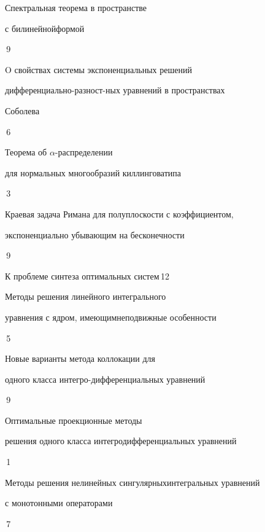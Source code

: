 

{Спектральная теорема в пространстве


с билинейной\newline формой}{\No\,9}




{O свойствах системы экспоненциальных решений 


дифференциально-разност-\newline ных уравнений в пространствах 


Соболева}{\No\,6}




{Теорема об $\alpha$-распределении


для нормальных многообразий киллингова\newline типа}{\No\,3}




{Краевая задача Римана для полуплоскости с коэффициентом,\newline


экспоненциально убывающим на бесконечности}{\No\,9}




{К проблеме синтеза оптимальных систем}{\No\,12}




{Методы решения линейного интегрального 


уравнения с ядром, имеющим\newline неподвижные особенности}{\No\,5}




{Новые варианты метода коллокации для  


одного класса интегро-\newline дифференциальных уравнений}{\No\,9}




{Оптимальные проекционные методы\newline


решения одного класса интегродифференциальных уравнений}{\No\,1}




{Методы решения нелинейных сингулярных\newline интегральных уравнений


с монотонными операторами}{\No\,7}




